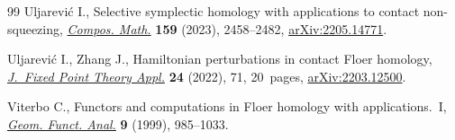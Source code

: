 \begin{thebibliography}{99}
Uljarevi\'c I., Selective symplectic homology with applications to contact
 non-squeezing,
 \href{https://doi.org/10.1112/s0010437x23007480}{\textit{Compos. Math.}}
 \textbf{159} (2023), 2458--2482,
 \href{http://arxiv.org/abs/2205.14771}{arXiv:2205.14771}.

Uljarevi\'c I., Zhang J., Hamiltonian perturbations in contact {F}loer
 homology, \href{https://doi.org/10.1007/s11784-022-00986-1}{\textit{J.~Fixed
 Point Theory Appl.}} \textbf{24} (2022), 71, 20~pages,
 \href{http://arxiv.org/abs/2203.12500}{arXiv:2203.12500}.

Viterbo C., Functors and computations in {F}loer homology with
 applications.~{I}, \href{https://doi.org/10.1007/s000390050106}{\textit{Geom.
 Funct. Anal.}} \textbf{9} (1999), 985--1033.

\end{thebibliography}
